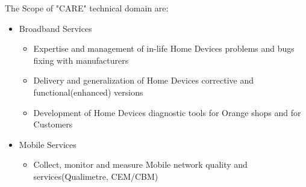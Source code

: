 The Scope of "CARE" technical domain are:
\begin{itemize}
	\item Broadband Services
	\begin{itemize}
		\item Expertise and management of in-life Home Devices problems and bugs fixing with manufacturers
		\item Delivery and generalization of Home Devices corrective and functional(enhanced) versions
		\item Development of Home Devices diagnostic tools for Orange shops and for Customers
	\end{itemize}
	\item Mobile Services
	\begin{itemize}
		\item Collect, monitor and measure Mobile network quality and services(Qualimetre, CEM/CBM)
	\end{itemize}
\end{itemize}
